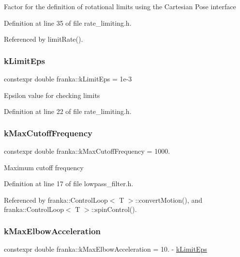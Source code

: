 Factor for the definition of rotational limits using the Cartesian Pose interface 

Definition at line 35 of file rate\+\_\+limiting.\+h.



Referenced by limit\+Rate().

\mbox{\label{namespacefranka_aad1f9b575274830b8da9e638559d424b}} 
\subsubsection{\texorpdfstring{k\+Limit\+Eps}{kLimitEps}}
{\footnotesize\ttfamily constexpr double franka\+::k\+Limit\+Eps = 1e-\/3}

Epsilon value for checking limits 

Definition at line 22 of file rate\+\_\+limiting.\+h.

\mbox{\label{namespacefranka_adb10b364af8deb9e17d9bcc1ff2695be}} 
\subsubsection{\texorpdfstring{k\+Max\+Cutoff\+Frequency}{kMaxCutoffFrequency}}
{\footnotesize\ttfamily constexpr double franka\+::k\+Max\+Cutoff\+Frequency = 1000.}

Maximum cutoff frequency 

Definition at line 17 of file lowpass\+\_\+filter.\+h.



Referenced by franka\+::\+Control\+Loop$<$ T $>$\+::convert\+Motion(), and franka\+::\+Control\+Loop$<$ T $>$\+::spin\+Control().

\mbox{\label{namespacefranka_af365e574ad7b1580ce15e30dd909b3ba}} 
\subsubsection{\texorpdfstring{k\+Max\+Elbow\+Acceleration}{kMaxElbowAcceleration}}
{\footnotesize\ttfamily constexpr double franka\+::k\+Max\+Elbow\+Acceleration = 10. -\/ \hyperlink{namespacefranka_aad1f9b575274830b8da9e638559d424b}{k\+Limit\+Eps}}

